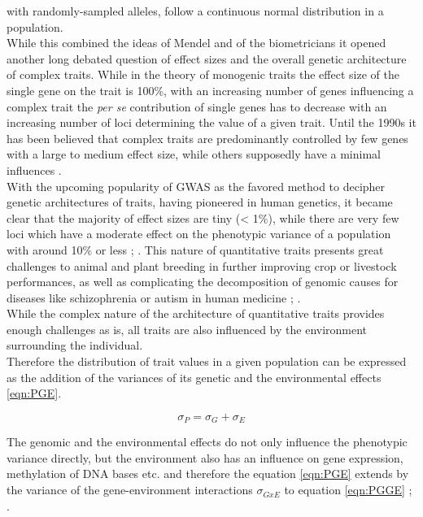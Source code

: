 with randomly-sampled alleles, follow a continuous normal distribution in a
population. \\
While this combined the ideas of Mendel and of the biometricians it opened another long
debated question of effect sizes and the overall genetic architecture of complex
traits. While in the theory of monogenic traits the effect size of the single gene on the
trait is 100\%, with an increasing number of genes influencing a complex trait the
\textit{per se} contribution of single genes has to decrease with an increasing number of
loci determining the value of a given trait. Until the 1990s it has been believed that
complex traits are predominantly controlled by few genes with a
large to medium effect size, while others supposedly have a minimal influences \cite{zhang2018esti}. \\
With the upcoming popularity of GWAS as the favored method to decipher genetic
architectures of traits, having pioneered in human genetics, it became clear that the
majority of effect sizes are tiny (< 1\%), while there are very few loci which have a
moderate effect on the phenotypic variance of a population with around 10\% or less
\cite{stringer2011}; \cite{korte2013advantages}. This nature of quantitative traits
presents great challenges to animal \cite{goddard2009} and plant breeding
\cite{wurschum2012} in further improving crop or livestock performances, as well as
complicating the decomposition of genomic causes for diseases like schizophrenia or autism in human medicine \cite{de2014}; \cite{purcell2014}. \\
While the complex nature of the architecture of quantitative traits provides enough
challenges as is, all traits are also influenced by the environment surrounding the individual.\\
Therefore the distribution of trait values in a given population can be expressed as the
addition of the variances of its genetic and the environmental effects \ref{eqn:PGE}.

\begin{equation}
 \sigma_{P} = \sigma_{G} + \sigma_{E}
 \label{eqn:PGE}
\end{equation}

The genomic and the environmental effects do not only influence the phenotypic variance directly, but
the environment also has an influence on gene expression, methylation of DNA bases etc. and
therefore the equation \ref{eqn:PGE} extends by the variance of the gene-environment
interactions $\sigma_{GxE}$  to equation \ref{eqn:PGGE}  \cite{lynch1998}; \cite{walsh2018}.
    
